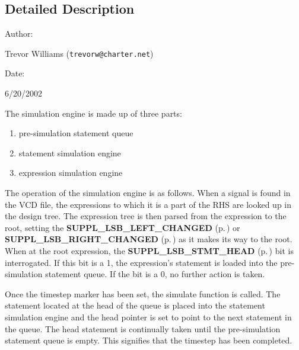 \subsection{Detailed Description}


\begin{Desc}
\item[Author: ]\par
Trevor Williams ({\tt trevorw@charter.net}) \end{Desc}
\begin{Desc}
\item[Date: ]\par
6/20/2002

 The simulation engine is made up of three parts:\begin{enumerate}
\item 
pre-simulation statement queue\item 
statement simulation engine\item 
expression simulation engine\end{enumerate}
\end{Desc}


 The operation of the simulation engine is as follows. When a signal is found in the VCD file, the expressions to which it is a part of the RHS are looked up in the design tree. The expression tree is then parsed from the expression to the root, setting the {\bf SUPPL\_\-LSB\_\-LEFT\_\-CHANGED} {\rm (p.\,\pageref{group__expr__suppl_a8})} or {\bf SUPPL\_\-LSB\_\-RIGHT\_\-CHANGED} {\rm (p.\,\pageref{group__expr__suppl_a9})} as it  makes its way to the root. When at the root expression, the {\bf SUPPL\_\-LSB\_\-STMT\_\-HEAD} {\rm (p.\,\pageref{group__expr__suppl_a3})}  bit is interrogated. If this bit is a 1, the expression's statement is loaded  into the pre-simulation statement queue. If the bit is a 0, no further action is  taken.

 Once the timestep marker has been set, the simulate function is called. The  statement located at the head of the queue is placed into the statement simulation  engine and the head pointer is set to point to the next statement in the queue.  The head statement is continually taken until the pre-simulation statement queue  is empty. This signifies that the timestep has been completed.

